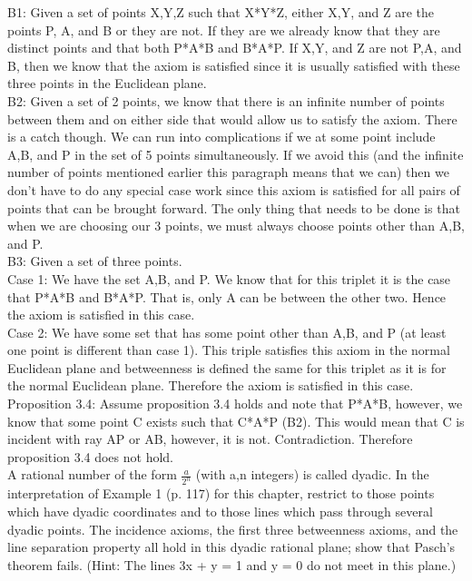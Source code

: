 \documentclass[12pt,letterpaper]{article}
\newcommand{\prob}[1]{\newpage\noindent {\bf #1}}
\begin{document}
B1: Given a set of points X,Y,Z such that X*Y*Z, either X,Y, and Z are the points P, A, and B or they are not.  If they are we already know that they are distinct points and that both P*A*B and B*A*P.  If X,Y, and Z are not P,A, and B, then we know that the axiom is satisfied since it is usually satisfied with these three points in the Euclidean plane. \\

B2: Given a set of 2 points, we know that there is an infinite number of points between them and on either side that would allow us to satisfy the axiom.  There is a catch though.  We can run into complications if we at some point include A,B, and P in the set of 5 points simultaneously.  If we avoid this (and the infinite number of points mentioned earlier this paragraph means that we can) then we don't have to do any special case work since this axiom is satisfied for all pairs of points that can be brought forward.  The only thing that needs to be done is that when we are choosing our 3 points, we must always choose points other than A,B, and P. \\

B3: Given a set of three points.\\

Case 1:  We have the set A,B, and P.  We know that for this triplet it is the case that P*A*B and B*A*P.  That is, only A can be between the other two. Hence the axiom is satisfied in this case.\\

Case 2:  We have some set that has some point other than A,B, and P (at least one point is different than case 1).  This triple satisfies this axiom in the normal Euclidean plane and betweenness is defined the same for this triplet as it is for the normal Euclidean plane.  Therefore the axiom is satisfied in this case.\\


Proposition 3.4: Assume proposition 3.4 holds and note that P*A*B, however, we know that some point C exists such that C*A*P (B2). This would mean that C is incident with ray AP or AB, however, it is not.  Contradiction.  Therefore proposition 3.4 does not hold.\\





\prob{17}  A rational number of the form $\frac{a}{2^n}$ (with a,n integers) is called dyadic.  In the interpretation of Example 1 (p. 117) for this chapter, restrict to those points which have dyadic coordinates and to those lines which pass through several dyadic points.  The incidence axioms, the first three betweenness axioms, and the line separation property all hold in this dyadic rational plane; show that Pasch's theorem fails.  (Hint:  The lines 3x + y = 1 and y = 0 do not meet in this plane.)\\
\end{document}
